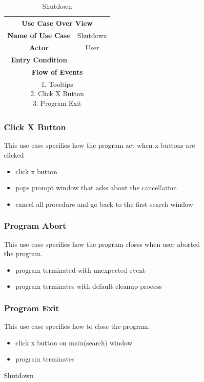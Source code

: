 \documentclass[conference]{IEEEtran}
\begin{document}
\begin{itemize}
\begin{itemize}
\begin{itemize}
\begin{itemize}
\begin{figure}[h]
\begin{enumerate}
\begin{itemize}
\begin{enumerate}
\begin{table}[hbt]
\renewcommand{\arraystretch}{1}
\caption{Shutdown}
\label{table:usecase4}
\centering
\begin{adjustbox}{width=0.4\textwidth}
\small
\begin{tabular}{c|c}
\hline
\multicolumn{2}{c}{\textbf{Use Case Over View}} \\
\hline
\textbf{Name of Use Case} & Shutdown\\
\hline
\textbf{Actor} & User \\
\hline
\textbf{Entry Condition} & \\
\hline
\multicolumn{2}{c}{\textbf{Flow of Events}}\\
\hline
\multicolumn{2}{c}{
\parbox[t]{5cm}{
  1. Tooltips \\
  2. Click X Button \\
  3. Program Exit
  }
}\\
\hline

\end{tabular}
\end{adjustbox}
\end{table}


\subsubsection{Click X Button}
This use case specifies how the program act when x buttons are clicked
\begin{itemize}
  \item click x button
  \item pops prompt window that asks about the cancellation
  \item cancel all procedure and go back to the first search window
\end{itemize}
\textit{}

\subsubsection{Program Abort}
This use case specifies how the program closes when user aborted the program.
\begin{itemize}
  \item program terminated with unexpected event
  \item program terminates with default cleanup process
\end{itemize}

\subsubsection{Program Exit}
This use case specifies how to close the program.
\begin{itemize}
  \item click x button on main(search) window
  \item program terminates
\end{itemize}
\textit{}




\end{enumerate}
\end{itemize}
\end{enumerate}
\end{figure}
\end{itemize}
\end{itemize}
\end{itemize}
\end{itemize}
\end{document}
